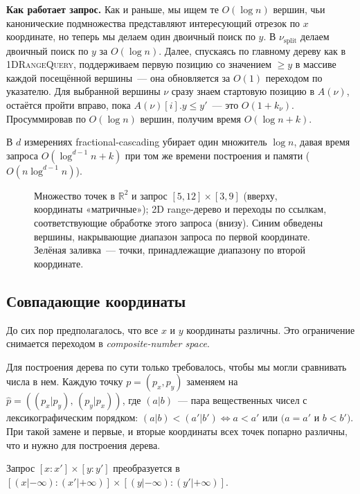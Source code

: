 \documentclass[12pt, a4paper]{article}
\theoremstyle{definition}
\theoremstyle{plain}
\theoremstyle{remark}
\begin{document}
\textbf{Как работает запрос.} Как и раньше, мы ищем те $O(\log n)$ вершин, чьи канонические подмножества представляют интересующий отрезок по $x$ координате, но теперь мы делаем один двоичный поиск по $y$. В $\nu_{\mathrm{split}}$ делаем двоичный поиск по $y$ за $O(\log n)$. Далее, спускаясь по главному дереву как в \textsc{1DRangeQuery}, поддерживаем первую позицию со значением $\geq y$ в массиве каждой посещённой вершины~--- она обновляется за $O(1)$ переходом по указателю. Для выбранной вершины $\nu$ сразу знаем стартовую позицию в $A(\nu)$, остаётся пройти вправо, пока $A(\nu)[i].y \leq y'$~--- это $O(1 + k_\nu)$. Просуммировав по $O(\log n)$ вершин, получим время $O(\log n + k)$.

В $d$ измерениях fractional-cascading убирает один множитель $\log n$, давая время запроса $O(\log^{d-1} n + k)$ при том же времени построения и памяти ($O(n\log^{d-1} n)$).

\begin{figure} \centering \vspace{-7mm}
  

  \caption{Множество точек в \(\mathbb{R}^2\) и запрос \([5, 12] \times [3, 9]\) (вверху, координаты «матричные»);
    2D range-дерево и переходы по ссылкам, соответствующие
    обработке этого запроса (внизу). Синим обведены вершины,
    накрывающие диапазон запроса по первой координате. Зелёная заливка~—
    точки, принадлежащие диапазону по второй координате.}
  \label{fig:range-tikz}
\end{figure}

\subsection{Совпадающие координаты}

До сих пор предполагалось, что все $x$ и $y$ координаты различны. Это ограничение снимается переходом в \textit{composite-number space}.

Для построения дерева по сути только требовалось, чтобы мы могли сравнивать числа в нем. Каждую точку $p = (p_x, p_y)$ заменяем на $\hat{p} = ((p_x | p_y),\, (p_y | p_x))$, где $(a | b)$~--- пара вещественных чисел с лексикографическим порядком: $(a|b) < (a'|b') \Leftrightarrow a < a'$ или $(a = a'$ и $b < b')$. При такой замене и первые, и вторые координаты всех точек попарно различны, что и нужно для построения дерева.

Запрос $[x:x'] \times [y:y']$ преобразуется в $[(x|-\infty):(x'|+\infty)] \times [(y|-\infty):(y'|+\infty)]$.
\end{document}
